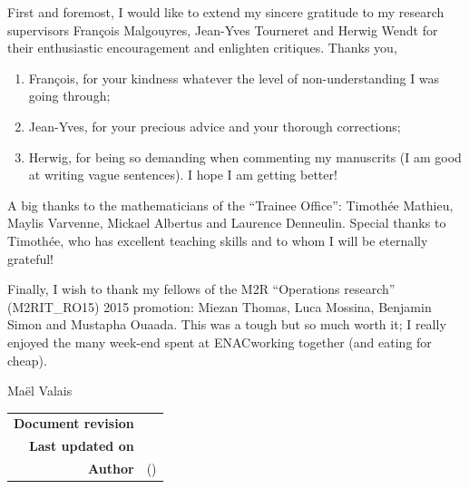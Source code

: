 \begin{foreword}[Acknowledgements]
First and foremost, I would like to extend my sincere gratitude to my research supervisors François Malgouyres, Jean-Yves Tourneret and Herwig Wendt for their enthusiastic encouragement and enlighten critiques. Thanks you,
\begin{enumerate}[label=--,noitemsep,nolistsep]
	\item François, for your kindness whatever the level of non-understanding I was going through;
	\item Jean-Yves, for your precious advice and your thorough corrections;
	\item Herwig, for being so demanding when commenting my manuscrits (I am good at writing vague sentences). I hope I am getting better!
\end{enumerate}

A big thanks to the mathematicians of the “Trainee Office”: Timothée Mathieu, Maylis Varvenne, Mickael Albertus and Laurence Denneulin. Special thanks to Timothée, who has excellent teaching skills and to whom I will be eternally grateful!

Finally, I wish to thank my fellows of the M2R “Operations research” (M2RIT\_RO15) 2015 promotion: Miezan Thomas, Luca Mossina, Benjamin Simon and Mustapha Ouaada. This was a tough but so much worth it; I really enjoyed the many week-end spent at ENAC\footnotemark[3] working together (and eating for cheap).

\begin{flushright}Maël Valais\end{flushright}

\end{foreword}

\begin{table}[hbt]\centering
  \begin{tabular}{>{\bf}rl}
   Document revision & \gitFirstTagDescribe{} \\
   Last updated on & \gitAuthorDate{} \\
   Author & \gitAuthorName{} (\gitAuthorEmail{})
  \end{tabular}
\end{table}
\vskip 2cm


